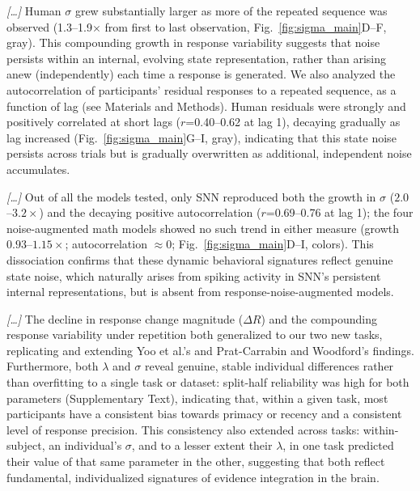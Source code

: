 \begin{ms}
\textit{[\ldots]} Human $\sigma$ grew substantially larger as more of the repeated sequence was observed (1.3--1.9$\times$ from first to last observation, Fig.~\ref{fig:sigma_main}D--F, gray). This compounding growth in response variability suggests that noise persists within an internal, evolving state representation, rather than arising anew (independently) each time a response is generated. We also analyzed the autocorrelation of participants' residual responses to a repeated sequence, as a function of lag (see Materials and Methods). Human residuals were strongly and positively correlated at short lags ($r$=0.40--0.62 at lag 1), decaying gradually as lag increased (Fig.~\ref{fig:sigma_main}G--I, gray), indicating that this state noise persists across trials but is gradually overwritten as additional, independent noise accumulates.

\textit{[\ldots]} Out of all the models tested, only SNN reproduced both the growth in $\sigma$ ($2.0$--$3.2\times$) and the decaying positive autocorrelation ($r$=0.69--0.76 at lag 1); the four noise-augmented math models showed no such trend in either measure (growth $0.93$--$1.15\times$; autocorrelation $\approx0$; Fig.~\ref{fig:sigma_main}D--I, colors). This dissociation confirms that these dynamic behavioral signatures reflect genuine state noise, which naturally arises from spiking activity in SNN's persistent internal representations, but is absent from response-noise-augmented models.

\textit{[\ldots]} The decline in response change magnitude ($\Delta R$) and the compounding response variability under repetition both generalized to our two new tasks, replicating and extending Yoo et al.'s \citep{yoo2025people} and Prat-Carrabin and Woodford's \citep{prat2024imprecise} findings. Furthermore, both $\lambda$ and $\sigma$ reveal genuine, stable individual differences rather than overfitting to a single task or dataset: split-half reliability was high for both parameters (Supplementary Text), indicating that, within a given task, most participants have a consistent bias towards primacy or recency and a consistent level of response precision. This consistency also extended across tasks: within-subject, an individual's $\sigma$, and to a lesser extent their $\lambda$, in one task predicted their value of that same parameter in the other, suggesting that both reflect fundamental, individualized signatures of evidence integration in the brain.
\end{ms}

